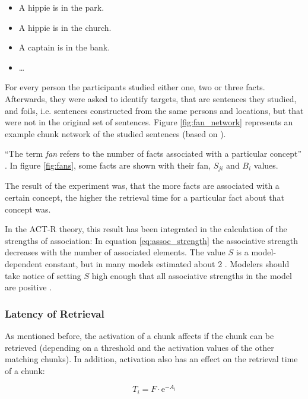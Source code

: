 \begin{itemize}
 \item A hippie is in the park.
 \item A hippie is in the church.
 \item A captain is in the bank.
 \item \dots
\end{itemize}

For every person the participants studied either one, two or three facts. Afterwards, they were asked to identify targets, that are sentences they studied, and foils, i.e. sentences constructed from the same persons and locations, but that were not in the original set of sentences. Figure \ref{fig:fan_network} represents an example chunk network of the studied sentences (based on \cite[fig.~1]{anderson_fan_1999}).

``The term \emph{fan} refers to the number of facts associated with a particular concept'' \cite[186]{anderson_fan_1999}. In figure \ref{fig:fans}, some facts are shown with their fan, $S_{ji}$ and $B_i$ values.

The result of the experiment was, that the more facts are associated with a certain concept, the higher the retrieval time for a particular fact about that concept was.

In the ACT-R theory, this result has been integrated in the calculation of the strengths of association: In equation \eqref{eq:assoc_strength} the associative strength decreases with the number of associated elements. The value $S$ is a model-dependent constant, but in many models estimated about 2 \cite[1042]{anderson_integrated_2004}. Modelers should take notice of setting $S$ high enough that all associative strengths in the model are positive \cite[unit 5, p. 3]{actr_tutorial}.

\subsubsection{Latency of Retrieval}

As mentioned before, the activation of a chunk affects if the chunk can be retrieved (depending on a threshold and the activation values of the other matching chunks). In addition, activation also has an effect on the retrieval time of a chunk:

\begin{equation}
\label{eq:retrieval_latency}
T_i = F \cdot \mathrm{e}^{-A_i}
\end{equation}

